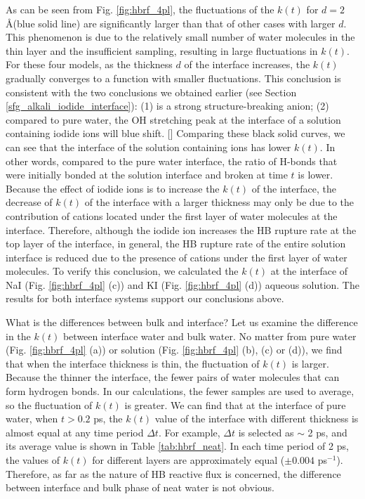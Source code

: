 As can be seen from Fig. \ref{fig:hbrf_4pl}, the fluctuations of the $k (t)$ for $d = 2$ \AA (blue solid line) are significantly larger 
than that of other cases with larger $d$. 
This phenomenon is due to the relatively small number of water molecules in the thin layer 
and the insufficient sampling, resulting in large fluctuations in $k(t)$.
For these four models, as the thickness $d$ of the interface increases, the $k(t)$ gradually converges to a function with smaller fluctuations.
%
This conclusion is consistent with the two conclusions we obtained earlier (see Section \ref{sfg_alkali_iodide_interface}): 
(1) \I is a strong structure-breaking anion; %
(2) compared to pure water, the OH stretching peak at the interface of a solution containing iodide ions will blue shift. [\cite{Tongraar2010}] 
Comparing these black solid curves, we can see that the interface of the solution containing ions has lower $k(t)$.
In other words, compared to the pure water interface, 
the ratio of H-bonds that were initially bonded at the solution interface and broken at time $t$ is lower.
Because the effect of iodide ions is to increase the $k(t)$ of the interface, the decrease of $k (t)$ of the interface with a larger thickness
may only be due to the contribution of cations located under the first layer of water molecules at the interface. 
Therefore, although the iodide ion increases the HB rupture rate at the top layer of the interface, 
in general, the HB rupture rate of the entire solution interface is reduced due to the presence of cations under the first layer of water molecules. 
To verify this conclusion, we calculated the $k(t)$ at the interface of NaI (Fig. \ref{fig:hbrf_4pl} (c)) and KI (Fig. \ref{fig:hbrf_4pl} (d)) aqueous solution. 
The results for both interface systems support our conclusions above.

What is the differences between bulk and interface? 
Let us examine the difference in the $k(t)$ between interface water and bulk water. 
No matter from pure water (Fig. \ref{fig:hbrf_4pl} (a)) 
or solution (Fig. \ref{fig:hbrf_4pl} (b), (c) or (d)), we find that when the interface thickness is thin, the fluctuation of $k(t)$ is larger.
Because the thinner the interface, the fewer pairs of water molecules that can form hydrogen bonds. 
In our calculations, the fewer samples are used to average, so the fluctuation of $k (t)$ is greater. 
We can find that at the interface of pure water, when $t> 0.2$ ps, the $k(t)$ value of the interface with different thickness is almost equal 
at any time period $\Delta t$. For example, $\Delta t$ is selected as $\sim$ 2 ps, 
and its average value is shown in Table \ref{tab:hbrf_neat}. In each time period of 2 ps, the values of $k(t)$ for different layers are approximately equal
($\pm 0.004$ ps$^{-1}$). Therefore, as far as the nature of HB reactive flux is concerned, the difference between interface and bulk phase of neat water is not obvious. 


